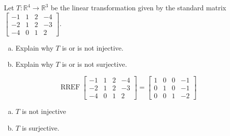 
\begin{exerciseStatement}
 Let \(T:\mathbb{R}^ 4  \to \mathbb{R}^ 3 \) be the linear transformation given by the standard matrix \( \left[\begin{array}{cccc}
-1 & 1 & 2 & -4 \\
-2 & 1 & 2 & -3 \\
-4 & 0 & 1 & 2
\end{array}\right] .\)
\begin{enumerate}[(a)]
\item Explain why \(T\) is or is not injective.
\item Explain why \(T\) is or is not surjective.
\end{enumerate}
    
\end{exerciseStatement}
    
\begin{exerciseAnswer} 


\[\operatorname{RREF} \left[\begin{array}{cccc}
-1 & 1 & 2 & -4 \\
-2 & 1 & 2 & -3 \\
-4 & 0 & 1 & 2
\end{array}\right] = \left[\begin{array}{cccc}
1 & 0 & 0 & -1 \\
0 & 1 & 0 & -1 \\
0 & 0 & 1 & -2
\end{array}\right] \]


\begin{enumerate}[(a)]
\item \(T\) is not injective
\item \(T\) is surjective.
\end{enumerate}
    
\end{exerciseAnswer}
    
